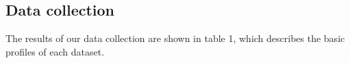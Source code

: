 \subsection{Data collection}
The results of our data collection are shown in table 1, which describes the basic profiles of each dataset.








